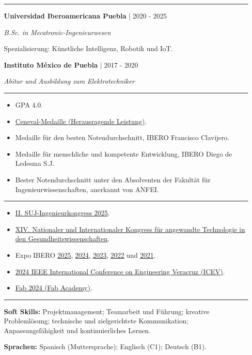 \documentclass[10pt,letterpaper]{article}
\newcommand{\sectionline}{\vspace{-2pt}\textcolor{accent}{\rule{\linewidth}{0.8pt}}\vspace{1pt}}
\newcommand{\cvsection}[1]{\vspace{5pt}{\large\bfseries\textcolor{navy}{#1}}\par\sectionline}
\newcommand{\entry}[3]{\textbf{#1} \textcolor{muted}{| #2}\par\textit{#3}\par}
\newcommand{\eventlink}[2]{\href{#1}{#2}}
\begin{document}
\cvsection{Ausbildung}
\entry{Universidad Iberoamericana Puebla}{2020 - 2025}{B.Sc. in Mecatronic-Ingenieurwesen}
Spezialisierung: K\"{u}nstliche Intelligenz, Robotik und IoT.

\entry{Instituto M\'{e}xico de Puebla}{2017 - 2020}{Abitur und Ausbildung zum Elektrotechniker}

\cvsection{Auszeichnungen \& Erfolge}
\begin{itemize}
  \item GPA 4.0.
  \item \href{https://jphajp.github.io/JPHAJP/Web/assets/docs/cenaval.pdf}{Ceneval-Medaille (Herausragende Leistung)}.
  \item Medaille f\"{u}r den besten Notendurchschnitt, IBERO Francisco Clavijero.
  \item Medaille f\"{u}r menschliche und kompetente Entwicklung, IBERO Diego de Ledesma S.J.
  \item Bester Notendurchschnitt unter den Absolventen der Fakult\"{a}t f\"{u}r Ingenieurwissenschaften, anerkannt von ANFEI.
\end{itemize}

\cvsection{Ausgew\"{a}hlte Vortr\"{a}ge}
\begin{itemize}
  \item \eventlink{https://congresossuj.mx/}{II. SUJ-Ingenieurkongress 2025}.
  \item \eventlink{https://www-optica.inaoep.mx/\string~tecnologia_salud/2024/programa.php}{XIV. Nationaler und Internationaler Kongress f\"{u}r angewandte Technologie in den Gesundheitswissenschaften}.
  \item Expo IBERO \eventlink{https://www.linkedin.com/posts/jphajp_robot-articulado-y-m\%C3\%B3vil-activity-7353272381097869313-Io7Q}{2025}, \eventlink{https://github.com/JPHAJP/Raspberry/tree/main/Interfaces/ProyectoUI}{2024}, \eventlink{https://repositorio.iberopuebla.mx/handle/20.500.11777/5915}{2023}, \eventlink{https://repositorio.iberopuebla.mx/handle/20.500.11777/5221}{2022} und \eventlink{https://www.linkedin.com/posts/jphajp_prototipo-de-regadera-con-temporizador-para-activity-7160025958538743809-kdxj}{2021}.
  \item \eventlink{https://ieeexplore.ieee.org/document/10765997}{2024 IEEE International Conference on Engineering Veracruz (ICEV)}.
  \item \eventlink{https://fabacademy.org/}{Fab 2024 (Fab Academy)}.
\end{itemize}

\cvsection{Soft Skills \& Sprachen}
\textbf{Soft Skills:} Projektmanagement; Teamarbeit und F\"{u}hrung; kreative Probleml\"{o}sung; technische und zielgerichtete Kommunikation; Anpassungsf\"{a}higkeit und kontinuierliches Lernen.\par
\textbf{Sprachen:} Spanisch (Muttersprache); Englisch (C1); Deutsch (B1).
\end{document}
